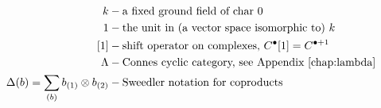 \begin{align*}
k 
&-
\textrm{a fixed ground field of char 0}\\
%
1
&-
\textrm{the unit in (a vector space 
isomorphic to) $k$}\\
%
[1]
&-
\textrm{shift operator on complexes, }
C^\bullet[1] = C^{\bullet+1}\\
\Lambda
&-
\textrm{Connes cyclic category, 
see Appendix \ref{chap:lambda}}\\
%
\Delta(b) = \sum_{(b)} b_{(1)} \otimes b_{(2)}
&-
\textrm{Sweedler notation for coproducts}
\end{align*}